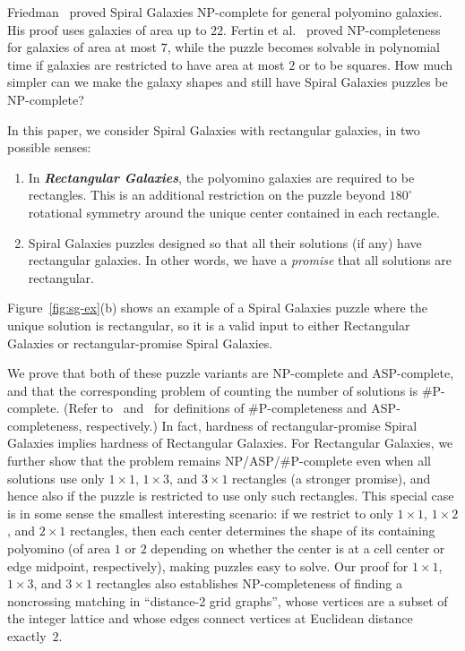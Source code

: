 \documentclass{elsarticle}
\newcommand{\defn}[1]{\textbf{\textit{\boldmath #1}}}
\begin{document}
Friedman~\cite{f-sgpnp-02} proved Spiral Galaxies NP-complete for general polyomino galaxies.
His proof uses galaxies of area up to $22$.
Fertin et al.~\cite{fjk-tagsg-15} proved NP-completeness for galaxies of area at most $7$, while the puzzle becomes solvable in polynomial time if galaxies are restricted to have area at most $2$ or to be squares.
How much simpler can we make the galaxy shapes and still have Spiral Galaxies puzzles be NP-complete?

In this paper, we consider Spiral Galaxies with rectangular galaxies,
in two possible senses:
%
\begin{enumerate}
\item In \defn{Rectangular Galaxies}, the polyomino galaxies are
  required to be rectangles.  This is an additional restriction on the puzzle
  beyond $180^\circ$ rotational symmetry around the unique center
  contained in each rectangle.
\item Spiral Galaxies puzzles designed so that all their solutions
  (if any) have rectangular galaxies.  In other words, we have a
  \emph{promise} that all solutions are rectangular.
\end{enumerate}
%
Figure~\ref{fig:sg-ex}(b) shows an example of a Spiral Galaxies puzzle where
the unique solution is rectangular, so it is a valid input to either
Rectangular Galaxies or rectangular-promise Spiral Galaxies.

We prove that both of these puzzle variants are NP-complete and ASP-complete,
and that the corresponding problem of counting the number of solutions is
\#P-complete.
(Refer to~\cite[Chapter 28]{v-aa-10} and~\cite{y-ccfas-03,ys-ccfas-03} for definitions of \#P-completeness and ASP-completeness, respectively.)
In fact, hardness of rectangular-promise Spiral Galaxies implies
hardness of Rectangular Galaxies.
For Rectangular Galaxies,
we further show that the problem remains NP/ASP/\#P-complete
even when all solutions use only $1\times1$, $1\times3$, and $3\times1$
rectangles (a stronger promise),
and hence also if the puzzle is restricted to use only such rectangles.
This special case is in some sense the smallest interesting scenario:
if we restrict to only $1\times1$, $1\times2$, and $2\times1$ rectangles,
then each center determines the shape of its containing polyomino
(of area $1$ or $2$ depending on whether the center is at a cell center
or edge midpoint, respectively), making puzzles easy to solve.
Our proof for $1\times1$, $1\times3$, and $3\times1$ rectangles
also establishes NP-completeness of finding a noncrossing matching in ``distance-2 grid graphs'', whose vertices are a subset of the integer lattice and whose edges connect vertices at Euclidean distance exactly~$2$. %
\end{document}
